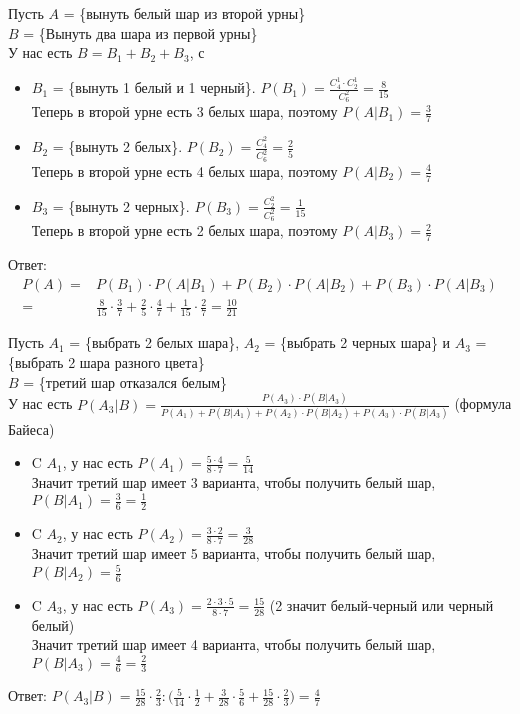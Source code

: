 \begin{exercise}[5]
	Пусть $A$ = \{вынуть белый шар из второй урны\} \\ $B$ = \{Вынуть два шара из первой урны\} \\ У нас есть $B = B_1 + B_2 + B_3$, с 
	\begin{itemize}
		\item $B_1$ = \{вынуть 1 белый и 1 черный\}. $P(B_1) = \frac{C^1_4 \cdot C^1_2}{C^2_6} = \frac{8}{15}$ \\ Теперь в второй урне есть 3 белых шара, поэтому $P(A | B_1) = \frac{3}{7}$
		\item $B_2$ = \{вынуть 2 белых\}. $P(B_2) = \frac{C^2_4}{C^2_6} = \frac{2}{5}$ \\ Теперь в второй урне есть 4 белых шара, поэтому $P(A | B_2) = \frac{4}{7}$
		\item $B_3$ = \{вынуть 2 черных\}. $P(B_3) = \frac{C^2_2}{C^2_6} = \frac{1}{15}$ \\ Теперь в второй урне есть 2 белых шара, поэтому $P(A | B_3) = \frac{2}{7}$
	\end{itemize}
	Ответ: 
	\begin{align*}
		P(A) = & P(B_1) \cdot P(A | B_1) + P(B_2) \cdot P(A | B_2) + P(B_3) \cdot P(A | B_3) \\ = & \frac{8}{15} \cdot \frac{3}{7} + \frac{2}{5} \cdot \frac{4}{7} + \frac{1}{15} \cdot \frac{2}{7} = \frac{10}{21}
	\end{align*}
\end{exercise}

\begin{exercise}[6]
	Пусть $A_1$ = \{выбрать 2 белых шара\}, $A_2$ = \{выбрать 2 черных шара\} и $A_3$ = \{выбрать 2 шара разного цвета\} \\ $B$ = \{третий шар отказался белым\} \\ У нас есть $P(A_3 | B) = \frac{P(A_3) \cdot P(B | A_3)}{P(A_1) + P(B|A_1) + P(A_2) \cdot P(B|A_2) + P(A_3) \cdot P(B | A_3)}$ (формула Байеса)
	\begin{itemize}
		\item C $A_1$, у нас есть $P(A_1) = \frac{5 \cdot 4}{8 \cdot 7} = \frac{5}{14}$ \\ Значит третий шар имеет 3 варианта, чтобы получить белый шар, $P(B | A_1) = \frac{3}{6} = \frac{1}{2}$
		\item C $A_2$, у нас есть $P(A_2) = \frac{3 \cdot 2}{8 \cdot 7} = \frac{3}{28}$ \\ Значит третий шар имеет 5 варианта, чтобы получить белый шар, $P(B | A_2) = \frac{5}{6}$
		\item C $A_3$, у нас есть $P(A_3) = \frac{2 \cdot 3 \cdot 5}{8 \cdot 7} = \frac{15}{28}$ (2 значит белый-черный или черный белый) \\ Значит третий шар имеет 4 варианта, чтобы получить белый шар, $P(B | A_3) = \frac{4}{6} = \frac{2}{3}$
	\end{itemize}
	Ответ: $P(A_3 | B) = \frac{15}{28} \cdot \frac{2}{3} : \Big(\frac{5}{14} \cdot \frac{1}{2} + \frac{3}{28} \cdot \frac{5}{6} + \frac{15}{28} \cdot \frac{2}{3}\Big) = \frac{4}{7}$
\end{exercise}

